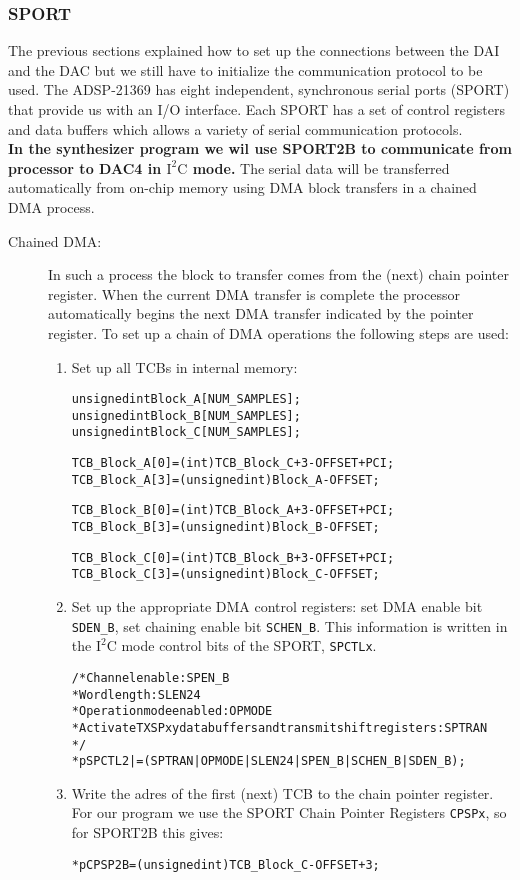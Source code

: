 \subsubsection{SPORT}
The previous sections explained how to set up the connections between the DAI and the DAC but we still have to initialize the communication protocol to be used. The ADSP-21369 has eight independent, synchronous serial ports (SPORT) that provide us with an I/O interface. Each SPORT has a set of control registers and data buffers which allows a variety of serial communication protocols.\\ 
\textbf{In the synthesizer program we wil use SPORT2B to communicate from processor to DAC4 in $\mathrm{I^{2}C}$ mode.} The serial data will be transferred automatically from on-chip memory using DMA block transfers in a chained DMA process.
\begin{description}
\item[Chained DMA:] In such a process the block to transfer comes from the (next) chain pointer register. When the current DMA transfer is complete the processor automatically begins the next DMA transfer indicated by the pointer register. To set up a chain of DMA operations the following steps are used:
\begin{enumerate}
\item Set up all TCBs in internal memory: 
\begin{alltt}
	unsigned int Block_A[NUM_SAMPLES] ;
	unsigned int Block_B[NUM_SAMPLES] ;
	unsigned int Block_C[NUM_SAMPLES] ;

	TCB_Block_A[0] = (int) TCB_Block_C + 3 - OFFSET + PCI ;
	TCB_Block_A[3] = (unsigned int) Block_A - OFFSET ;

	TCB_Block_B[0] = (int) TCB_Block_A + 3 - OFFSET + PCI ;
	TCB_Block_B[3] = (unsigned int) Block_B - OFFSET ;

	TCB_Block_C[0] = (int) TCB_Block_B + 3 - OFFSET + PCI ;
	TCB_Block_C[3] = (unsigned int) Block_C - OFFSET ;
\end{alltt}
\item Set up the appropriate DMA control registers: set DMA enable bit \verb+SDEN_B+, set chaining enable bit \verb+SCHEN_B+. This information is written in the $\mathrm{I^{2}C}$ mode control bits of the SPORT, \verb|SPCTLx|. 
\begin{alltt}
	/* Channel enable: SPEN_B
	 * Word length: SLEN24
	 * Operation mode enabled: OPMODE
	 * Activate TXSPxy data buffers and transmit shift registers: SPTRAN
	 */ 
    *pSPCTL2 |= (SPTRAN | OPMODE | SLEN24 | SPEN_B | SCHEN_B | SDEN_B) ;
\end{alltt}
\item Write the adres of the first (next) TCB to the chain pointer register. For our program we use the SPORT Chain Pointer Registers \verb+CPSPx+, so for SPORT2B this gives:
\begin{alltt}
    *pCPSP2B = (unsigned int) TCB_Block_C - OFFSET + 3 ;
\end{alltt}
\end{enumerate}
\end{description}

